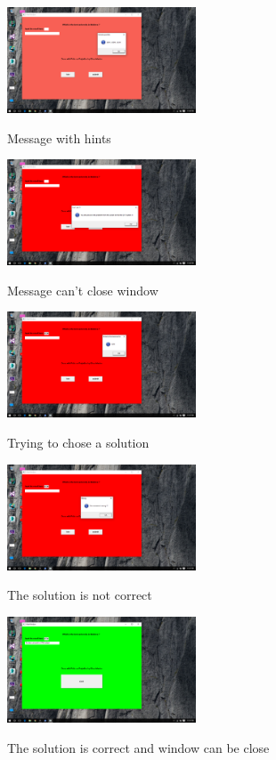 \begin{figure}[h!]
  \centering
    {%
      \includegraphics[width=0.5\textwidth]{screen4}}
  \caption{Message with hints}
\end{figure}

\begin{figure}[h!]
  \centering
    {%
      \includegraphics[width=0.5\textwidth]{screen5}}
  \caption{Message can't close window}
\end{figure}

\begin{figure}[h!]
  \centering
    {%
      \includegraphics[width=0.5\textwidth]{screen6}}
  \caption{Trying to chose a solution}
\end{figure}

\begin{figure}[h!]
  \centering
    {%
      \includegraphics[width=0.5\textwidth]{screen7}}
  \caption{The solution is not correct}
\end{figure}

\begin{figure}[h!]
  \centering
    {%
      \includegraphics[width=0.5\textwidth]{screen8}}
  \caption{The solution is correct and window can be close}
\end{figure}
\clearpage
